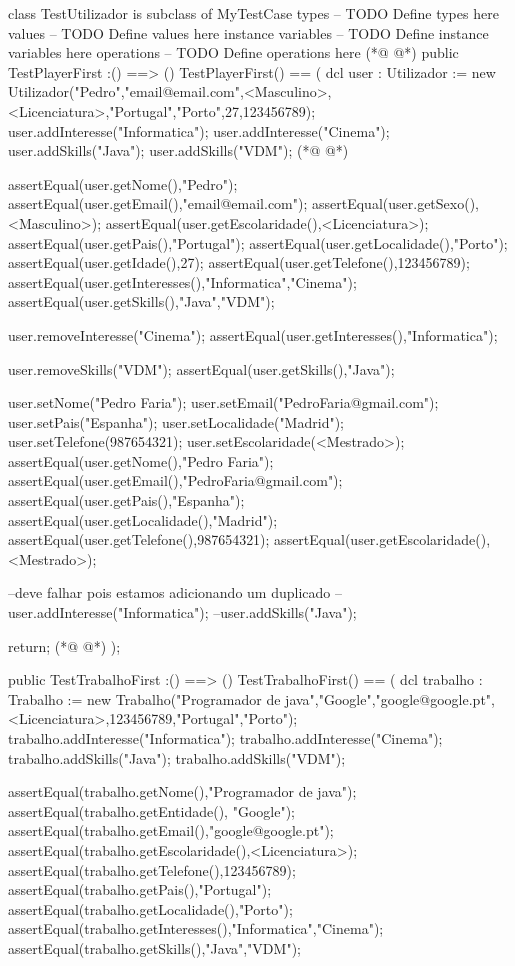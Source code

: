 \begin{vdmpp}[breaklines=true]
class TestUtilizador is subclass of MyTestCase
types
-- TODO Define types here
values
-- TODO Define values here
instance variables
-- TODO Define instance variables here
operations
-- TODO Define operations here
(*@
\label{TestPlayerFirst:10}
@*)
public TestPlayerFirst :() ==> ()
TestPlayerFirst() ==
(
 dcl user : Utilizador := new Utilizador("Pedro","email@email.com",<Masculino>,<Licenciatura>,"Portugal","Porto",27,123456789);
 user.addInteresse("Informatica");
 user.addInteresse("Cinema");
 user.addSkills("Java");
 user.addSkills("VDM");
(*@
\label{main:18}
@*)
 
 assertEqual(user.getNome(),"Pedro");
 assertEqual(user.getEmail(),"email@email.com");
 assertEqual(user.getSexo(),<Masculino>);
 assertEqual(user.getEscolaridade(),<Licenciatura>);
 assertEqual(user.getPais(),"Portugal");
 assertEqual(user.getLocalidade(),"Porto");
 assertEqual(user.getIdade(),27);
 assertEqual(user.getTelefone(),123456789);
 assertEqual(user.getInteresses(),{"Informatica","Cinema"});
 assertEqual(user.getSkills(),{"Java","VDM"});
 
 user.removeInteresse("Cinema");
 assertEqual(user.getInteresses(),{"Informatica"});
 
 user.removeSkills("VDM");
 assertEqual(user.getSkills(),{"Java"});
 
 user.setNome("Pedro Faria");
 user.setEmail("PedroFaria@gmail.com");
 user.setPais("Espanha");
 user.setLocalidade("Madrid");
 user.setTelefone(987654321);
 user.setEscolaridade(<Mestrado>);
 assertEqual(user.getNome(),"Pedro Faria");
 assertEqual(user.getEmail(),"PedroFaria@gmail.com");
 assertEqual(user.getPais(),"Espanha");
 assertEqual(user.getLocalidade(),"Madrid");
 assertEqual(user.getTelefone(),987654321);
 assertEqual(user.getEscolaridade(),<Mestrado>);
 
 --deve falhar pois estamos adicionando um duplicado
 --user.addInteresse("Informatica");
 --user.addSkills("Java");
 
 return;
(*@
\label{TestTrabalhoFirst:54}
@*)
);


public TestTrabalhoFirst :() ==> ()
TestTrabalhoFirst() ==
(
 dcl trabalho : Trabalho := new Trabalho("Programador de java","Google","google@google.pt",<Licenciatura>,123456789,"Portugal","Porto");
 trabalho.addInteresse("Informatica");
 trabalho.addInteresse("Cinema");
 trabalho.addSkills("Java");
 trabalho.addSkills("VDM");
 
 assertEqual(trabalho.getNome(),"Programador de java");
 assertEqual(trabalho.getEntidade(), "Google");
 assertEqual(trabalho.getEmail(),"google@google.pt");
 assertEqual(trabalho.getEscolaridade(),<Licenciatura>);
 assertEqual(trabalho.getTelefone(),123456789);
 assertEqual(trabalho.getPais(),"Portugal");
 assertEqual(trabalho.getLocalidade(),"Porto");
 assertEqual(trabalho.getInteresses(),{"Informatica","Cinema"});
 assertEqual(trabalho.getSkills(),{"Java","VDM"});
 

\end{vdmpp}
